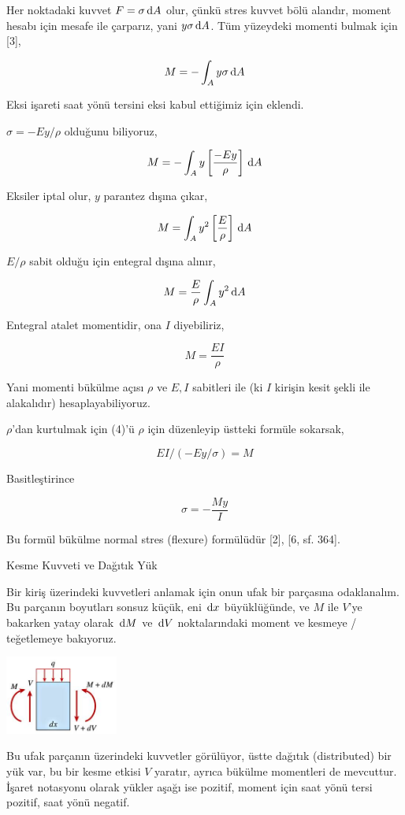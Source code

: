 \documentclass[12pt,fleqn]{article}\usepackage{../../common}
\begin{document}
Her noktadaki kuvvet $F = \sigma \,\mathrm{d} A$ olur, çünkü stres kuvvet bölü alandır,
moment hesabı için mesafe ile çarparız, yani $y \sigma \,\mathrm{d} A$. Tüm yüzeydeki
momenti bulmak için [3],

$$
M = - \int_A y \sigma \,\mathrm{d} A
$$

Eksi işareti saat yönü tersini eksi kabul ettiğimiz için eklendi.

$\sigma = -Ey/\rho$ olduğunu biliyoruz,

$$
M = - \int_A y \left[ \frac{-Ey}{\rho} \right] \,\mathrm{d} A
$$

Eksiler iptal olur, $y$ parantez dışına çıkar,

$$
M = \int_A y^2 \left[ \frac{E}{\rho} \right] \,\mathrm{d} A
$$

$E/\rho$ sabit olduğu için entegral dışına alınır,

$$
M = \frac{E}{\rho} \int_A y^2 \,\mathrm{d} A
$$

Entegral atalet momentidir, ona $I$ diyebiliriz, 

$$
M = \frac{EI}{\rho}
$$

Yani momenti bükülme açısı $\rho$ ve $E,I$ sabitleri ile (ki $I$ kirişin kesit
şekli ile alakalıdır) hesaplayabiliyoruz.

$\rho$'dan kurtulmak için (4)'ü $\rho$ için düzenleyip üstteki formüle sokarsak,

$$
EI / (-Ey / \sigma )  = M
$$

Basitleştirince

$$
\sigma = - \frac{M y}{I}
$$

Bu formül bükülme normal stres (flexure) formülüdür [2], [6, sf. 364].

Kesme Kuvveti ve Dağıtık Yük

Bir kiriş üzerindeki kuvvetleri anlamak için onun ufak bir parçasına
odaklanalım. Bu parçanın boyutları sonsuz küçük, eni $\,\mathrm{d} x$ büyüklüğünde, ve
$M$ ile $V$'ye bakarken yatay olarak $\,\mathrm{d} M$ ve $\,\mathrm{d} V$ noktalarındaki moment ve
kesmeye / teğetlemeye bakıyoruz.

\includegraphics[width=10em]{phy_020_strs_02_10.jpg}

Bu ufak parçanın üzerindeki kuvvetler görülüyor, üstte dağıtık (distributed) bir
yük var, bu bir kesme etkisi $V$ yaratır, ayrıca bükülme momentleri de
mevcuttur. İşaret notasyonu olarak yükler aşağı ise pozitif, moment için
saat yönü tersi pozitif, saat yönü negatif.
\end{document}
